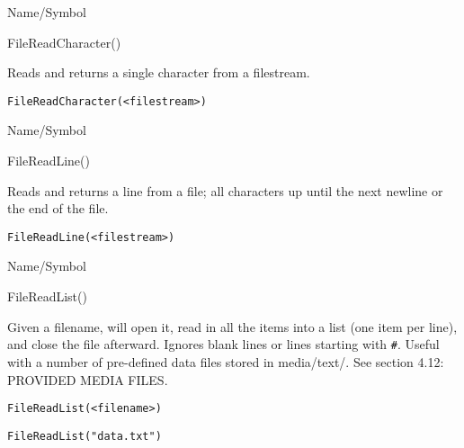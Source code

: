 \rl




\begin{desc}{Name/Symbol}
\item[Name/Symbol]	FileReadCharacter()

\item[Description]	Reads and returns a single character from a filestream.

\item[Usage]
\begin{verbatim}
FileReadCharacter(<filestream>)
\end{verbatim}

\item[Example]	

\item[See Also]	
\end{desc}

\rl




\begin{desc}{Name/Symbol}
\item[Name/Symbol]	FileReadLine()

\item[Description]	Reads and returns a line from a file; all characters up
		until the next newline or the end of the file.

\item[Usage]
\begin{verbatim}
FileReadLine(<filestream>)
\end{verbatim}

\item[Example]	

\item[See Also]	
\end{desc}

\rl




\begin{desc}{Name/Symbol}
\item[Name/Symbol]  	FileReadList()
 
\item[Description]  	Given a filename, will open it, read in all the items
	     	into a list (one item per line), and close the file
	     	afterward. Ignores blank lines or lines starting with \verb+#+.
	     	Useful with a number of pre-defined data files stored in
	     	media/text/.  See section 4.12: PROVIDED MEDIA FILES.

\item[Usage]
\begin{verbatim}
FileReadList(<filename>)
\end{verbatim}

\item[Example]
\begin{verbatim}
FileReadList("data.txt")
\end{verbatim}

\item[See Also]
\end{desc}

